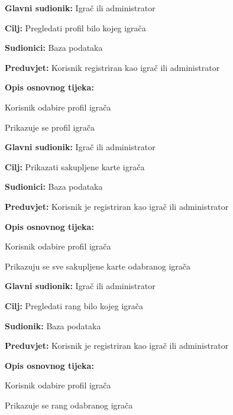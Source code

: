 \noindent {}
\begin{packed_item}
    \item \textbf{Glavni sudionik: }Igrač ili administrator
    \item \textbf{Cilj: }Pregledati profil bilo kojeg igrača
    \item \textbf{Sudionici: }Baza podataka
    \item \textbf{Preduvjet: }Korisnik registriran kao igrač ili administrator
    \item \textbf{Opis osnovnog tijeka: }
    \item[] \begin{packed_enum}
        \item Korisnik odabire profil igrača
        \item Prikazuje se profil igrača
    \end{packed_enum}
\end{packed_item}

\noindent {}
\begin{packed_item}
    \item \textbf{Glavni sudionik: }Igrač ili administrator
    \item \textbf{Cilj: } Prikazati sakupljene karte igrača
    \item \textbf{Sudionici: }Baza podataka
    \item \textbf{Preduvjet: }Korisnik je registriran kao igrač ili administrator
    \item \textbf{Opis osnovnog tijeka: }
    \item[] \begin{packed_enum}
        \item Korisnik odabire profil igrača
        \item Prikazuju se sve sakupljene karte odabranog igrača 
    \end{packed_enum}
\end{packed_item}

\noindent {}
\begin{packed_item}
    \item \textbf{Glavni sudionik: }Igrač ili administrator
    \item \textbf{Cilj: }Pregledati rang bilo kojeg igrača
    \item \textbf{Sudionik: }Baza podataka
    \item \textbf{Preduvjet: }Korisnik je registriran kao igrač ili administrator
    \item \textbf{Opis osnovnog tijeka:}
    \item[] \begin{packed_enum}
        \item Korisnik odabire profil igrača 
        \item Prikazuje se rang odabranog igrača
    \end{packed_enum}
\end{packed_item}

